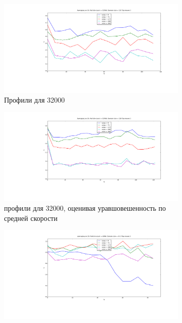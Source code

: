         \begin{figure}
        \centering
        \begin{subfigure}{0.45\textwidth}
                \includegraphics[width=\textwidth]{Images/32k_slices}
                \caption{Профили для 32000}
                \label{fig:Results:32k}
        \end{subfigure}
        \begin{subfigure}{0.45\textwidth}
                \includegraphics[width=\textwidth]{Images/32k_slicesOldAlg}
                \caption{профили для 32000, оценивая уравшовешенность по средней скорости}
                \label{fig:Results:32kOld}
        \end{subfigure}
        \begin{subfigure}{0.45\textwidth}
                \includegraphics[width=\textwidth]{Images/4k_slices_newAlg}

\end{subfigure}
\end{figure}
